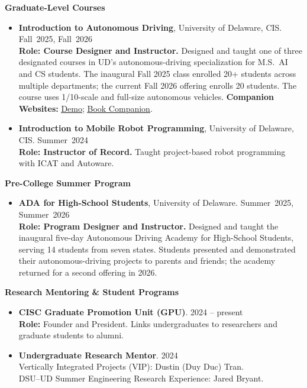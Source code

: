 \documentclass[11pt]{article}
\let\cvplainhref\href
\renewcommand{\href}[2]{\cvplainhref{#1}{\uline{#2}}}
\newcommand{\cvsubsection}[1]{%
  \Needspace{3\baselineskip}%
  \vspace{0.32em}%
  {\bfseries #1}\par
  \vspace{0.12em}
}
\begin{document}
\cvsubsection{Graduate-Level Courses}
\begin{itemize}
    \item \textbf{Introduction to Autonomous Driving}, University of Delaware, CIS. \hfill Fall~2025, Fall~2026\\
    \textbf{Role: Course Designer and Instructor.} Designed and taught one of three designated courses in UD's autonomous-driving specialization for M.S.\ AI and CS students. The inaugural Fall 2025 class enrolled 20+ students across multiple departments; the current Fall 2026 offering enrolls 20 students. The course uses 1/10-scale and full-size autonomous vehicles. \textbf{Companion Websites:} \href{https://thecarlab.github.io/AVBook/}{Demo}; \href{https://autonomousdrivingbook.org/book-chapters}{Book Companion}.
    \item \textbf{Introduction to Mobile Robot Programming}, University of Delaware, CIS. \hfill Summer~2024\\
    \textbf{Role: Instructor of Record.} Taught project-based robot programming with ICAT and Autoware.
\end{itemize}

\cvsubsection{Pre-College Summer Program}
\begin{itemize}
    \item \textbf{ADA for High-School Students}, University of Delaware. \hfill Summer~2025, Summer~2026\\
    \textbf{Role: Program Designer and Instructor.} Designed and taught the inaugural five-day Autonomous Driving Academy for High-School Students, serving 14 students from seven states. Students presented and demonstrated their autonomous-driving projects to parents and friends; the academy returned for a second offering in 2026.
\end{itemize}

\cvsubsection{Research Mentoring \& Student Programs}
\begin{itemize}
    \item \textbf{CISC Graduate Promotion Unit (GPU)}. \hfill 2024 -- present\\
    \textbf{Role:} Founder and President. Links undergraduates to researchers and graduate students to alumni.
    \item \textbf{Undergraduate Research Mentor}. \hfill 2024\\
    Vertically Integrated Projects (VIP): Dustin (Duy Duc) Tran.\\
    DSU--UD Summer Engineering Research Experience: Jared Bryant.
\end{itemize}
\end{document}
